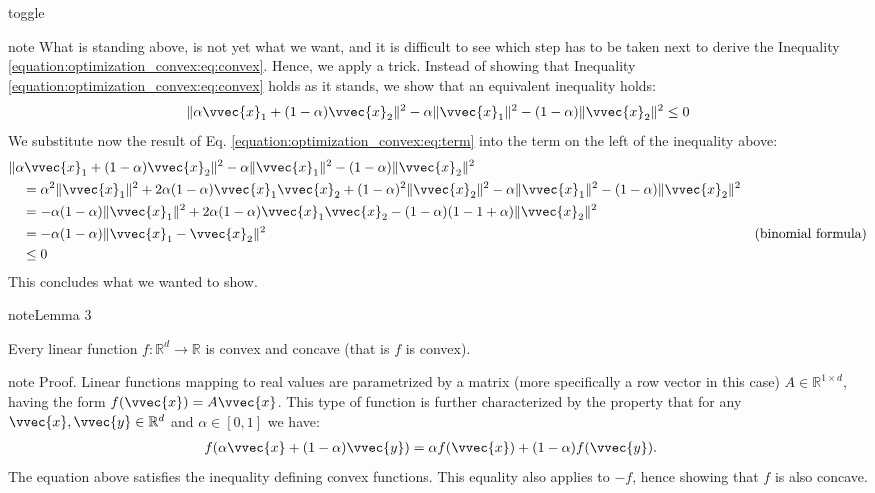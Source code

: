 \documentclass[letterpaper,10pt,english]{jupyterBook}
\begin{document}
\begin{sphinxuseclass}{toggle}
\begin{sphinxadmonition}{note}
\sphinxAtStartPar
What is standing above, is not yet what we want, and it is difficult to see which step has to be taken next to derive the Inequality \eqref{equation:optimization_convex:eq:convex}. Hence, we apply a trick. Instead of showing that  Inequality \eqref{equation:optimization_convex:eq:convex} holds as it stands, we show that an equivalent inequality holds:
\begin{align*}
    \lVert\alpha\vvec{x}_1 +(1-\alpha)\vvec{x}_2\rVert^2 - \alpha\lVert\vvec{x}_1\rVert^2 - (1-\alpha)\lVert\vvec{x}_2\rVert^2\leq 0 
\end{align*}
\sphinxAtStartPar
We substitute now the result of Eq. \eqref{equation:optimization_convex:eq:term} into the term on the left of the inequality above:
\begin{align*}
    &\lVert\alpha\vvec{x}_1 +(1-\alpha)\vvec{x}_2\rVert^2 - \alpha\lVert\vvec{x}_1\rVert^2 - (1-\alpha)\lVert\vvec{x}_2\rVert^2\\ 
     &\quad=
    \alpha^2\lVert\vvec{x}_1\rVert^2 +2\alpha(1-\alpha)\vvec{x}_1\vvec{x}_2 +( 1-\alpha)^2\lVert\vvec{x}_2\rVert^2- \alpha\lVert\vvec{x}_1\rVert^2 - (1-\alpha)\lVert\vvec{x}_2\rVert^2
    \\
    &\quad= -\alpha(1-\alpha)\lVert\vvec{x}_1\rVert^2  +2\alpha(1-\alpha)\vvec{x}_1\vvec{x}_2 -( 1-\alpha)(1-1+\alpha)\lVert\vvec{x}_2\rVert^2\\
    &\quad= - \alpha(1-\alpha) \lVert\vvec{x}_1-\vvec{x}_2\rVert^2&\text{(binomial formula)}\\
    &\quad\leq 0
\end{align*}
\sphinxAtStartPar
This concludes what we wanted to show.
\end{sphinxadmonition}

\end{sphinxuseclass}\label{optimization_convex:lemma-8}
\begin{sphinxadmonition}{note}{Lemma 3}



\sphinxAtStartPar
Every linear function \(f:\mathbb{R}^d\rightarrow\mathbb{R}\) is convex and concave (that is \sphinxhyphen{}\(f\) is convex).
\end{sphinxadmonition}

\begin{sphinxadmonition}{note}
\sphinxAtStartPar
Proof. Linear functions mapping to real values are parametrized by a matrix (more specifically a row vector in this case) \(A\in\mathbb{R}^{1\times d}\), having the form \(f(\vvec{x})=A\vvec{x}\). This type of function is further characterized by the property that for any \(\vvec{x},\vvec{y}\in\mathbb{R}^d\) and \(\alpha\in[0,1]\) we have:
\begin{align*}
    f(\alpha\vvec{x} +(1-\alpha)\vvec{y}) &= \alpha f(\vvec{x}) +(1-\alpha)f(\vvec{y}).
\end{align*}
\sphinxAtStartPar
The equation above satisfies the inequality defining convex functions. This equality also applies to \(-f\), hence showing that \(f\) is also concave.
\end{sphinxadmonition}
\end{document}
